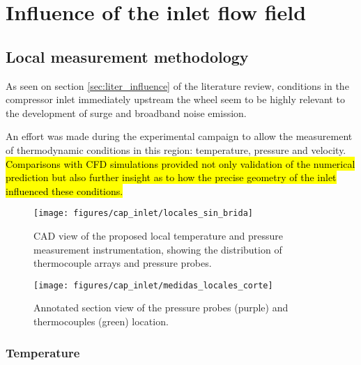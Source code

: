 \chapter{Influence of the inlet flow field}
\label{cap:inlet}

\section{Local measurement methodology}

As seen on section \ref{sec:liter_influence} of the literature review, conditions in the compressor inlet immediately upstream the wheel seem to be highly relevant to the development of surge and broadband noise emission. 

An effort was made during the experimental campaign to allow the measurement of thermodynamic conditions in this region: temperature, pressure and velocity. \hl{Comparisons with CFD simulations provided not only validation of the numerical prediction but also further insight as to how the precise geometry of the inlet influenced these conditions.}

\begin{figure}[htb!]
\centering
\texttt{[image: figures/cap\_inlet/locales\_sin\_brida]}
\caption{CAD view of the proposed local temperature and pressure measurement instrumentation, showing the distribution of thermocouple arrays and pressure probes.}
\label{fig:metod_local_meas}
\end{figure}


\begin{figure}[b!]
\centering
\texttt{[image: figures/cap\_inlet/medidas\_locales\_corte]}
\caption{Annotated section view of the pressure probes (purple) and thermocouples (green) location.}
\label{fig:metod_local_meas_dimen}
\end{figure}

\subsection{Temperature}

